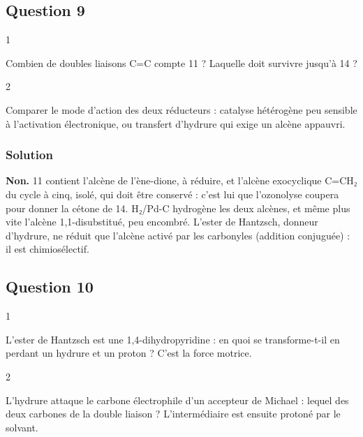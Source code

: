 \documentclass[11pt,a4paper]{article}
\begin{document}
\hypertarget{question-9}{%
\subsection{Question 9}\label{question-9}}

\begin{indication}{1}

Combien de doubles liaisons C=C compte 11 ? Laquelle doit survivre jusqu'à 14 ?

\end{indication}

\begin{indication}{2}

Comparer le mode d'action des deux réducteurs : catalyse hétérogène peu sensible à l'activation électronique, ou transfert d'hydrure qui exige un alcène appauvri.

\end{indication}

\hypertarget{solution-8}{%
\subsubsection{Solution}\label{solution-8}}

\textbf{Non.} 11 contient l'alcène de l'ène-dione, à réduire, et l'alcène exocyclique C=CH₂ du cycle à cinq, isolé, qui doit être conservé : c'est lui que l'ozonolyse coupera pour donner la cétone de 14. H₂/Pd-C hydrogène les deux alcènes, et même plus vite l'alcène 1,1-disubstitué, peu encombré. L'ester de Hantzsch, donneur d'hydrure, ne réduit que l'alcène activé par les carbonyles (addition conjuguée) : il est chimiosélectif.

\hypertarget{question-10}{%
\subsection{Question 10}\label{question-10}}

\begin{indication}{1}

L'ester de Hantzsch est une 1,4-dihydropyridine : en quoi se transforme-t-il en perdant un hydrure et un proton ? C'est la force motrice.

\end{indication}

\begin{indication}{2}

L'hydrure attaque le carbone électrophile d'un accepteur de Michael : lequel des deux carbones de la double liaison ? L'intermédiaire est ensuite protoné par le solvant.

\end{indication}
\end{document}
